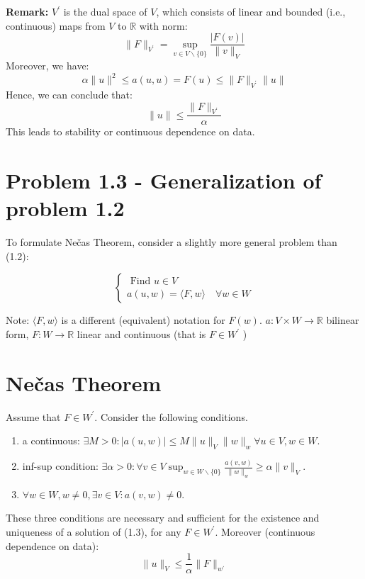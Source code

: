 \documentclass[11pt]{book}
\begin{document}
\textbf{Remark:} $V^{\prime}$ is the dual space of $V$, which consists of linear and bounded (i.e., continuous) maps from $V$ to $\mathbb{R}$ with norm:
$$
\|F\|_{V^{\prime}}=\sup _{v \in V \backslash\{0\}} \frac{|F(v)|}{\|v\|_{V}}
$$
Moreover, we have:
$$
\alpha\|u\|^{2} \leq a(u, u)=F(u) \leq\|F\|_{V^{\prime}}\|u\|
$$
Hence, we can conclude that:
$$
\|u\| \leq \frac{\|F\|_{V^{\prime}}}{\alpha}
$$
This leads to stability or continuous dependence on data. 

\section{Problem 1.3 - Generalization of problem 1.2}
To formulate Nečas Theorem, consider a slightly more general problem than (1.2):

\begin{equation}
\left\{\begin{array}{l}
\text { Find } u \in V \\
a(u, w)=\langle F, w\rangle \quad \forall w \in W
\end{array}\right.
\end{equation}


Note: $\langle F, w\rangle$ is a different (equivalent) notation for $F(w)$.
$a: V \times W \rightarrow \mathbb{R}$ bilinear form,
$F: W \rightarrow \mathbb{R}$ linear and continuous (that is $F \in W^{\prime}$ )

\section{Nečas Theorem}
Assume that $F \in W^{\prime}$. Consider the following conditions.\\
\begin{enumerate}[label=\roman*)]

\item  a continuous: $\exists M>0:|a(u, w)| \leq M\|u\|_V\|w\|_w \forall u \in V, w \in W$.\\
\item inf-sup condition: $\exists \alpha>0: \forall v \in V \sup _{w \in W \backslash\{0\}} \frac{a(v, w)}{\|w\|_w} \geq \alpha\|v\|_V$. \\
\item $\forall w \in W, w \neq 0, \exists v \in V: a(v, w) \neq 0$. \\ 
\end{enumerate}
These three conditions are necessary and sufficient for the existence and uniqueness of a solution of (1.3), for any $F \in W^{\prime}$.
Moreover (continuous dependence on data):
$$
\|u\|_V \leq \frac{1}{\alpha}\|F\|_{w^{\prime}}
$$
\end{document}
